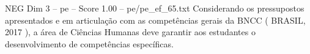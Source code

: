 \begin{textsample}{NEG Dim 3 – pe – Score 1.00 – pe/pe\_ef\_65.txt}
Considerando os pressupostos apresentados e em articulação com as competências gerais da BNCC ( BRASIL, 2017 ), a área de Ciências Humanas deve garantir aos estudantes o desenvolvimento de competências específicas.

\end{textsample}
